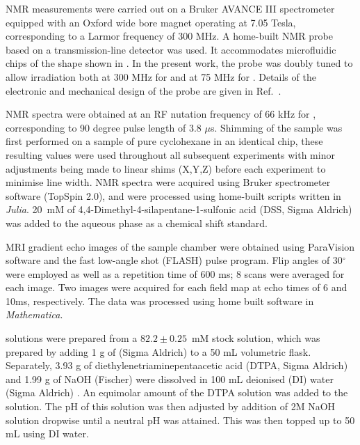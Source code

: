NMR measurements were carried out on a Bruker AVANCE III
spectrometer equipped with an Oxford wide bore magnet operating at 7.05 Tesla,
corresponding to a  Larmor frequency of 300 MHz. A home-built NMR probe
based on a transmission-line detector was used.\cite{Finch:2016gv}
It accommodates microfluidic chips of the shape shown in .
In the present work, the probe was doubly
tuned to allow irradiation both at 300 MHz for  and at 75 MHz for
. Details of the electronic and mechanical design of the
probe are given in Ref.~\cite{Finch:2017vb}.

NMR spectra were obtained at an RF nutation frequency of 66 kHz for
, corresponding to 90 degree pulse length of
3.8 $\mu$s. Shimming of the sample was first performed on a sample of pure cyclohexane
in an identical chip, these resulting values were used throughout all subsequent experiments with
minor adjustments being made to linear shims (X,Y,Z) before each experiment to minimise line width. NMR spectra were acquired using Bruker spectrometer software (TopSpin 2.0),
and were processed using home-built scripts written in \textit{Julia}.\cite{Bezanson:2017gd}
20~mM of 4,4-Dimethyl-4-silapentane-1-sulfonic acid (DSS, Sigma Aldrich) was added to the aqueous phase
as a chemical shift standard.

MRI gradient echo images of the sample chamber were obtained using ParaVision software and the fast low-angle shot (FLASH) pulse program. Flip angles of 30$^\circ$ were employed as well as a repetition time of 600 ms; 8 scans were averaged for each image. Two images were acquired for each field map at echo times of 6 and 10ms, respectively. The data was processed using home built software in \textit{Mathematica}.

 solutions were prepared  from a $82.2\pm0.25$~mM
stock solution, which was prepared by adding 1 g of 
(Sigma Aldrich) to a 50 mL volumetric flask. Separately,
3.93 g of diethylenetriaminepentaacetic acid (DTPA, Sigma Aldrich)
and 1.99 g of NaOH (Fischer) were dissolved in 100 mL deionised (DI) water (Sigma Aldrich) .
An equimolar amount of the DTPA solution was added to the  solution. The pH of this solution was then adjusted by addition of 2M NaOH solution dropwise until a neutral pH was attained.
This was then topped up to 50 mL using DI water.


